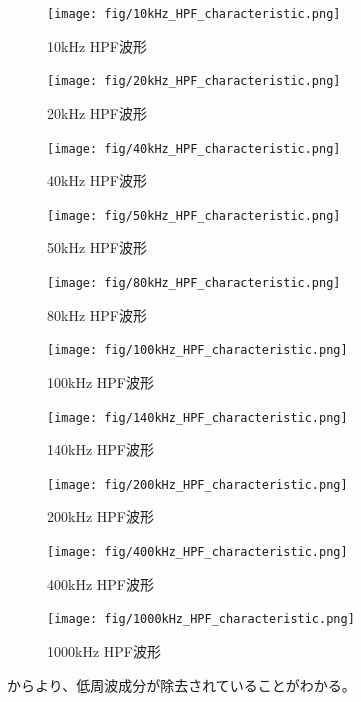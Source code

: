 \documentclass[11pt,dvipdfmx]{jarticle}
\begin{document}
\begin{figure}[H]
  \centering
  \texttt{[image: fig/10kHz\_HPF\_characteristic.png]}
  \caption{10kHz HPF波形}
  \label{fig:10kHz_HPF}
\end{figure}
\begin{figure}[H]
  \centering
  \texttt{[image: fig/20kHz\_HPF\_characteristic.png]}
  \caption{20kHz HPF波形}
  \label{fig:20kHz_HPF}
\end{figure}
\begin{figure}[H]
  \centering
  \texttt{[image: fig/40kHz\_HPF\_characteristic.png]}
  \caption{40kHz HPF波形}
  \label{fig:40kHz_HPF}
\end{figure}
\begin{figure}[H]
  \centering
  \texttt{[image: fig/50kHz\_HPF\_characteristic.png]}
  \caption{50kHz HPF波形}
  \label{fig:50kHz_HPF}
\end{figure}
\begin{figure}[H]
  \centering
  \texttt{[image: fig/80kHz\_HPF\_characteristic.png]}
  \caption{80kHz HPF波形}
  \label{fig:80kHz_HPF}
\end{figure}
\begin{figure}[H]
  \centering
  \texttt{[image: fig/100kHz\_HPF\_characteristic.png]}
  \caption{100kHz HPF波形}
  \label{fig:100kHz_HPF}
\end{figure}
\begin{figure}[H]
  \centering
  \texttt{[image: fig/140kHz\_HPF\_characteristic.png]}
  \caption{140kHz HPF波形}
  \label{fig:150kHz_HPF}
\end{figure}
\begin{figure}[H]
  \centering
  \texttt{[image: fig/200kHz\_HPF\_characteristic.png]}
  \caption{200kHz HPF波形}
  \label{fig:200kHz_HPF}
\end{figure}
\begin{figure}[H]
  \centering
  \texttt{[image: fig/400kHz\_HPF\_characteristic.png]}
  \caption{400kHz HPF波形}
  \label{fig:400kHz_HPF}
\end{figure}
\begin{figure}[H]
  \centering
  \texttt{[image: fig/1000kHz\_HPF\_characteristic.png]}
  \caption{1000kHz HPF波形}
  \label{fig:1000kHz_HPF}
\end{figure}
からより、低周波成分が除去されていることがわかる。
\end{document}
